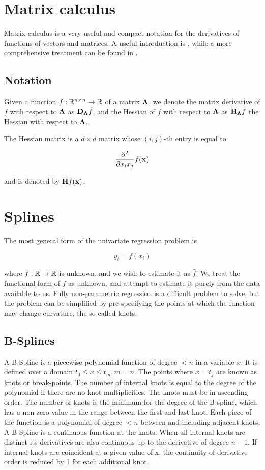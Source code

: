 \documentclass{amsart}[12pt]
\begin{document}
\section{Matrix calculus}

Matrix calculus is a very useful and compact notation for the derivatives of functions of vectors and matrices.
A useful introduction is \cite{wand02}, while a more comprehensive treatment can be found in
\cite{MagnusNeudecker99}.

\subsection{Notation}

Given a function $f:{\mathbb{R}}^{n \times n} \to {\mathbb{R}}$ of a matrix ${\boldsymbol \Lambda}$, we denote the matrix derivative of $f$ with 
respect to ${\boldsymbol \Lambda}$ as ${\bf D}_{\boldsymbol \Lambda} f$, and the Hessian of $f$ with respect to ${\boldsymbol \Lambda}$ as
${\bf H}_{\boldsymbol \Lambda} f$ the Hessian with respect to ${\boldsymbol \Lambda}$.

The Hessian matrix is a $d \times d$ matrix whose $(i, j)$-th entry is equal to

$$
\frac{\partial^2}{\partial x_i x_j} f({\bf x})
$$

and is denoted by ${\bf H} f({\bf x})$.

\section{Splines}
The most general form of the univariate regression problem is

$$
y_i = f(x_i)
$$

where $f: {\mathbb{R}} \to {\mathbb{R}}$ is unknown, and we wish to estimate it as $\hat{f}$. We treat the functional form of
$f$ as unknown, and attempt to estimate it purely from the data available to us. Fully non-parametric regression
is a difficult problem to solve, but the problem can be simplified by pre-specifying the points at which the
function may change curvature, the so-called knots.

\subsection{B-Splines}
A B-Spline is a piecewise polynomial function of degree $< n$ in a variable $x$. It is defined over a
domain $t_0 \leq x \leq t_m, m=n$. The points where $x = t_j$ are known as knots or break-points. The
number of internal knots is equal to the degree of the polynomial if there are no knot multiplicities.
The knots must be in ascending order. The number of knots is the minimum for the degree of the B-spline,
which has a non-zero value in the range between the first and last knot. Each piece of the function is a
polynomial of degree $< n$ between and including adjacent knots. A B-Spline is a continuous function at the
knots. When all internal knots are distinct its derivatives are also continuous up to the derivative of degree
$n - 1$. If internal knots are coincident at a given value of x, the continuity of derivative order is reduced
by 1 for each additional knot.
\end{document}
